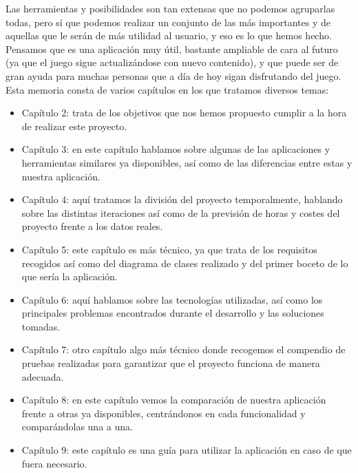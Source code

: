 Las herramientas y posibilidades son tan extensas que no podemos agruparlas todas, pero sí que podemos realizar un conjunto de las más importantes y de aquellas que le serán de más utilidad al usuario, y eso es lo que hemos hecho. Pensamos que es una aplicación muy útil, bastante ampliable de cara al futuro (ya que el juego sigue actualizándose con nuevo contenido), y que puede ser de gran ayuda para muchas personas que a día de hoy sigan disfrutando del juego.\\

Esta memoria consta de varios capítulos en los que tratamos diversos temas:

\begin{itemize}
	\item Capítulo 2: trata de los objetivos que nos hemos propuesto cumplir a la hora de realizar este proyecto.
	
	\item Capítulo 3: en este capítulo hablamos sobre algunas de las aplicaciones y herramientas similares ya disponibles, así como de las diferencias entre estas y nuestra aplicación.
	
	\item Capítulo 4: aquí tratamos la división del proyecto temporalmente, hablando sobre las distintas iteraciones así como de la previsión de horas y costes del proyecto frente a los datos reales.
	
	\item Capítulo 5: este capítulo es más técnico, ya que trata de los requisitos recogidos así como del diagrama de clases realizado y del primer boceto de lo que sería la aplicación.
	
	\item Capítulo 6: aquí hablamos sobre las tecnologías utilizadas, así como los principales problemas encontrados durante el desarrollo y las soluciones tomadas.
	
	\item Capítulo 7: otro capítulo algo más técnico donde recogemos el compendio de pruebas realizadas para garantizar que el proyecto funciona de manera adecuada.
	
	\item Capítulo 8: en este capítulo vemos la comparación de nuestra aplicación frente a otras ya disponibles, centrándonos en cada funcionalidad y comparándolas una a una.
	
	\item Capítulo 9: este capítulo es una guía para utilizar la aplicación en caso de que fuera necesario.
	
\end{itemize}